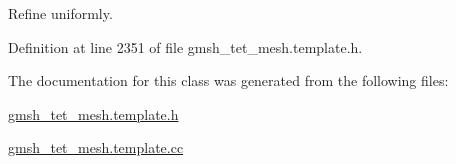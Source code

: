 Refine uniformly. 



Definition at line 2351 of file gmsh\+\_\+tet\+\_\+mesh.\+template.\+h.



The documentation for this class was generated from the following files\+:\begin{DoxyCompactItemize}
\item 
\hyperlink{gmsh__tet__mesh_8template_8h}{gmsh\+\_\+tet\+\_\+mesh.\+template.\+h}\item 
\hyperlink{gmsh__tet__mesh_8template_8cc}{gmsh\+\_\+tet\+\_\+mesh.\+template.\+cc}\end{DoxyCompactItemize}
